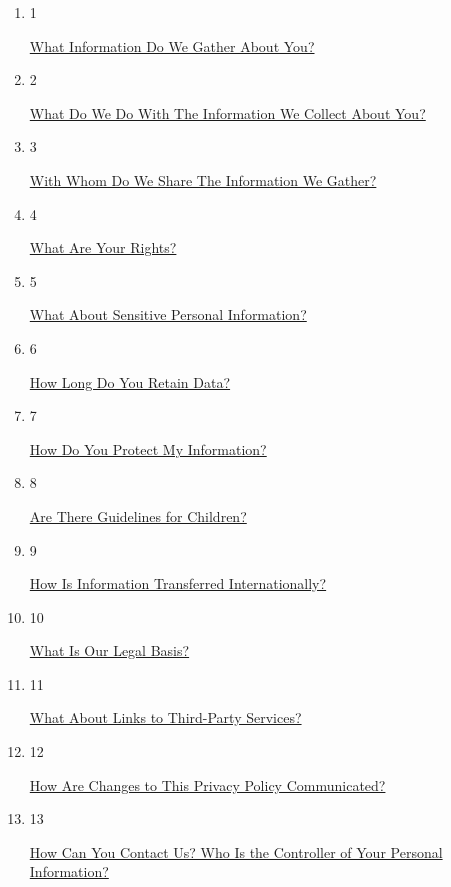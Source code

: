 \begin{enumerate}
\def\labelenumi{\arabic{enumi}.}
\item
  1

  \href{what-information-do-we-gather-about-you}{What Information Do We
  Gather About You?}
\item
  2

  \href{what-do-we-do-with-the-information-we-gather}{What Do We Do With
  The Information We Collect About You?}
\item
  3

  \href{with-whom-do-we-share-the-information-we-gather}{With Whom Do We
  Share The Information We Gather?}
\item
  4

  \href{what-are-your-rights}{What Are Your Rights?}
\item
  5

  \href{what-about-sensitive-personal-information}{What About Sensitive
  Personal Information?}
\item
  6

  \href{how-long-do-you-retain-data}{How Long Do You Retain Data?}
\item
  7

  \href{how-do-you-protect-my-information}{How Do You Protect My
  Information?}
\item
  8

  \href{are-there-guidelines-for-children}{Are There Guidelines for
  Children?}
\item
  9

  \href{how-is-my-information-transferred-internationally}{How Is
  Information Transferred Internationally?}
\item
  10

  \href{what-is-our-legal-basis}{What Is Our Legal Basis?}
\item
  11

  \href{links-to-third-party-services}{What About Links to Third-Party
  Services?}
\item
  12

  \href{how-are-changes-to-this-privacy-policy-communicated}{How Are
  Changes to This Privacy Policy Communicated?}
\item
  13

  \href{how-can-you-contact-us-who-is-the-controller-of-your-personal-information}{How
  Can You Contact Us? Who Is the Controller of Your Personal
  Information?}
\end{enumerate}

